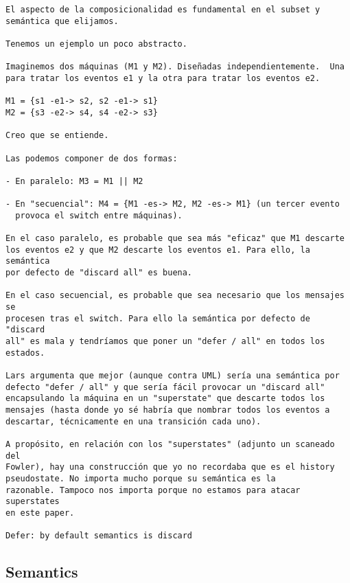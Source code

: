\begin{verbatim}
El aspecto de la composicionalidad es fundamental en el subset y
semántica que elijamos.

Tenemos un ejemplo un poco abstracto.

Imaginemos dos máquinas (M1 y M2). Diseñadas independientemente.  Una
para tratar los eventos e1 y la otra para tratar los eventos e2.

M1 = {s1 -e1-> s2, s2 -e1-> s1}
M2 = {s3 -e2-> s4, s4 -e2-> s3}

Creo que se entiende.

Las podemos componer de dos formas:

- En paralelo: M3 = M1 || M2

- En "secuencial": M4 = {M1 -es-> M2, M2 -es-> M1} (un tercer evento
  provoca el switch entre máquinas).

En el caso paralelo, es probable que sea más "eficaz" que M1 descarte
los eventos e2 y que M2 descarte los eventos e1. Para ello, la semántica
por defecto de "discard all" es buena.

En el caso secuencial, es probable que sea necesario que los mensajes se
procesen tras el switch. Para ello la semántica por defecto de "discard
all" es mala y tendríamos que poner un "defer / all" en todos los
estados.

Lars argumenta que mejor (aunque contra UML) sería una semántica por
defecto "defer / all" y que sería fácil provocar un "discard all"
encapsulando la máquina en un "superstate" que descarte todos los
mensajes (hasta donde yo sé habría que nombrar todos los eventos a
descartar, técnicamente en una transición cada uno).

A propósito, en relación con los "superstates" (adjunto un scaneado del
Fowler), hay una construcción que yo no recordaba que es el history
pseudostate. No importa mucho porque su semántica es la
razonable. Tampoco nos importa porque no estamos para atacar superstates
en este paper.

Defer: by default semantics is discard
\end{verbatim}

\subsection{Semantics}

